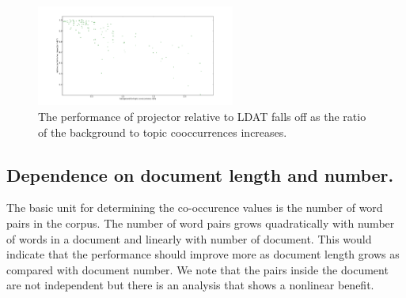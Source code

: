\begin{figure}[t]
                  \includegraphics[width=0.58\textwidth]{projldaT-ratio.pdf}
    \caption{The performance of projector relative to LDAT falls off as the ratio of the background
to topic cooccurrences increases.
}
   \label{fig:ratio}
\end{figure}



\subsection{Dependence on document length and number.}






The basic unit for determining the co-occurence values is the
number of word pairs in the corpus. The number of word pairs
grows quadratically with number of words in a document
and linearly with number of document.  This would indicate
that the performance should improve more as document length
grows as compared with document number.  We note that
the pairs inside the document are not independent but
there is an analysis that shows a nonlinear benefit.


